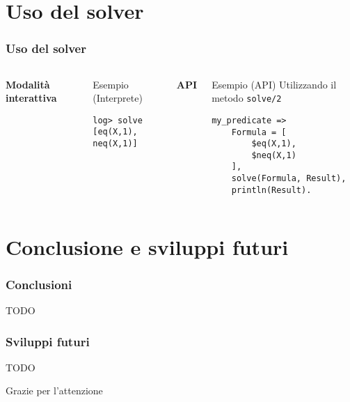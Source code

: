 \documentclass{beamer}
\begin{document}
\section{Uso del solver}

\begin{frame}[fragile]
  \frametitle{Uso del solver}
  \begin{columns}[c]
    \textbf{Modalità interattiva}
    \begin{exampleblock}{Esempio (Interprete)}
\begin{verbatim}
log> solve 
[eq(X,1), neq(X,1)]
\end{verbatim}
    \end{exampleblock}

    \textbf{API}
    \begin{exampleblock}{Esempio (API)}
      Utilizzando il metodo \texttt{solve/2}
\begin{verbatim}
my_predicate =>
    Formula = [ 
        $eq(X,1), 
        $neq(X,1) 
    ],
    solve(Formula, Result),
    println(Result).
\end{verbatim}
    \end{exampleblock}
  \end{columns}
\end{frame}

\section{Conclusione e sviluppi futuri}

\begin{frame}
  \frametitle{Conclusioni}
  TODO
\end{frame}


\begin{frame}
  \frametitle{Sviluppi futuri}
  TODO
\end{frame}


\begin{frame}
  \Huge{\centerline{Grazie per l'attenzione}}
\end{frame}

\end{document}
